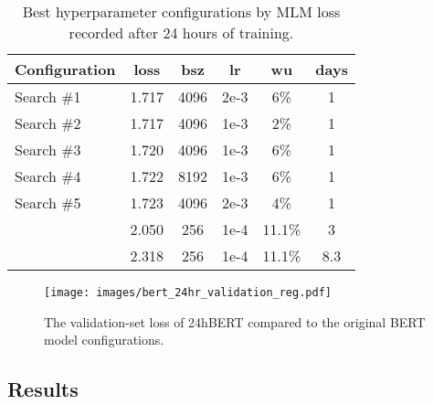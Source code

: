 \begin{table}[t]
\centering
\small
\begin{tabular}{@{}lccccc@{}}
\toprule
\textbf{Configuration} &
\bf loss &
\bf bsz &
\bf lr &
\bf wu &
\bf days \\
\midrule
Search \#1 & 1.717 & 4096 & 2e-3 & 6\% & 1 \\
Search \#2 & 1.717 & 4096 & 1e-3 & 2\% & 1 \\
Search \#3 & 1.720 & 4096 & 1e-3 & 6\% & 1 \\
Search \#4 & 1.722 & 8192 & 1e-3 & 6\% & 1 \\
Search \#5 & 1.723 & 4096 & 2e-3 & 4\% & 1 \\
\midrule
\bertbase{}   & 2.050 & 256 & 1e-4 & 11.1\% & 3 \\
\bertlarge{}  & 2.318 & 256 & 1e-4 & 11.1\% & 8.3 \\
\bottomrule
\end{tabular}
\caption{Best hyperparameter configurations by MLM loss recorded after 24 hours of training.}
\label{tab:best_24hr_configs}
\end{table}
 
\begin{figure}
\centering
\texttt{[image: images/bert\_24hr\_validation\_reg.pdf]}
\caption{The validation-set loss of 24hBERT compared to the original BERT model configurations.}
\label{fig:bert_comparison_in_24hr}
\end{figure}


\subsection{Results}

